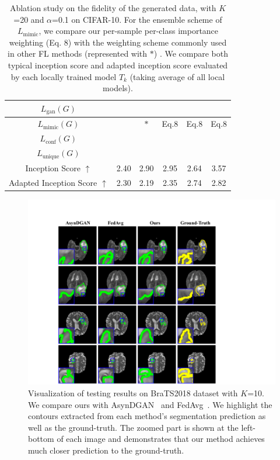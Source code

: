 \documentclass[letterpaper]{article} %
\newcommand{\cmark}{\ding{51}}%
\newcommand{\xmark}{\ding{55}}%
\begin{document}
\begin{table}[t]
\begin{center}
\resizebox{\columnwidth}{!}
{
\begin{tabular}{c|ccccc}
\hline
$L_\text{gan}(G)$  &\cmark &\cmark &\cmark &\cmark &\cmark \\\hline
{$L_\text{mimic}(G)$} &\xmark  &$*$ &Eq.8  &Eq.8  &Eq.8 \\\hline
{$L_\text{conf}(G)$} &\xmark &\xmark &\xmark  &\cmark &\cmark\\\hline
{$L_\text{unique}(G)$} &\xmark &\xmark &\xmark  &\xmark &\cmark\\\hline
{Inception Score $\uparrow$} &2.40 &2.90 &2.95 &2.64 &3.57 \\
{Adapted Inception Score $\uparrow$} &2.30 &2.19 &2.35 &2.74 &2.82 \\
\hline
\end{tabular}}

\end{center}
\caption{Ablation study on the fidelity of the generated data, with $K$=20 and $\alpha$=0.1 on CIFAR-10. For the ensemble scheme of $L_\text{mimic}$, we compare our per-sample per-class importance weighting (Eq. 8) with the weighting scheme commonly used in other FL methods (represented with $*$) \cite{lin2020ensemble, hsu2020federated}. We compare both typical inception score and adapted inception score  evaluated by each locally trained model $T_k$ (taking average of all local models).}
\label{tab:cifars1}
\end{table}


\begin{figure}[h]
\centering
\includegraphics[width=\linewidth]{fig/sfig1.pdf}
\caption{Visualization of testing results on BraTS2018 dataset with $K$=10. We compare ours with AsynDGAN~\cite{chang2020synthetic} and FedAvg~\cite{mcmahan2017communication}.  We highlight the contours extracted from each method's segmentation prediction as well as the ground-truth. The zoomed part is shown at the left-bottom of each image and demonstrates that our method achieves much closer prediction to the ground-truth.
}
\label{fig:s1}
\end{figure}
\end{document}
